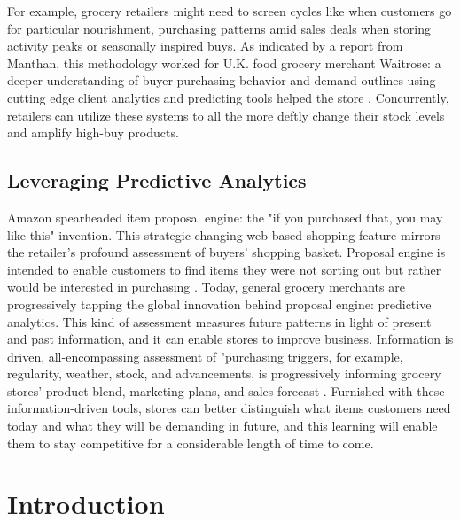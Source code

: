 \documentclass[sigconf]{acmart}
\begin{document}
For example, grocery retailers might need to screen cycles like when customers go for particular nourishment, purchasing patterns amid sales deals when storing activity peaks or seasonally inspired buys. As indicated by a report from Manthan, this methodology worked for U.K. food grocery merchant Waitrose: a deeper understanding of buyer purchasing behavior and demand outlines using cutting edge client analytics and predicting tools helped the store \cite{13}. Concurrently, retailers can utilize these systems to all the more deftly change their stock levels and amplify high-buy products. 


\subsection{Leveraging Predictive Analytics}

Amazon spearheaded item proposal engine: the "if you purchased that, you may like this" invention. This strategic changing web-based shopping feature mirrors the retailer's profound assessment of buyers' shopping basket.  Proposal engine is intended to enable customers to find items they were not sorting out but rather would be interested in purchasing \cite{10}. Today, general grocery merchants are progressively tapping the global innovation behind proposal engine: predictive analytics. This kind of assessment measures future patterns in light of present and past information, and it can enable stores to improve business. Information is driven, all-encompassing assessment of "purchasing triggers, for example, regularity, weather, stock, and advancements, is progressively informing grocery stores' product blend, marketing plans, and sales forecast \cite{14}. Furnished with these information-driven tools, stores can better distinguish what items customers need today and what they will be demanding in future, and this learning will enable them to stay competitive for a considerable length of time to come.  

\section{Introduction}
\end{document}
